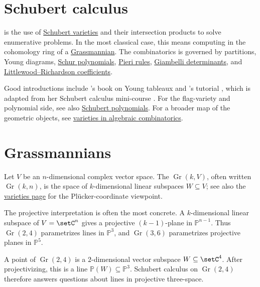 
\section[schubertCalculus]{Schubert calculus}

\label{schubertCalculusDefinition} is the use of
\hyperref[schubertVarietiesAndMatroids]{Schubert varieties} and their intersection
products to solve enumerative problems.  In the most classical case, this means
computing in the cohomology ring of a \hyperref[grassmannianVarieties]{Grassmannian}.
The combinatorics is governed by partitions, Young diagrams,
\hyperref[schurS]{Schur polynomials},
\hyperref[schubertCalculusPieri]{Pieri rules},
\hyperref[schubertCalculusGiambelli]{Giambelli determinants}, and
\hyperref[schurLittlewoodRichardson]{Littlewood--Richardson coefficients}.

Good introductions include 's book on Young tableaux
\cite{Fulton1997} and 's tutorial
\cite{Gillespie2019}, which is adapted from her Schubert calculus mini-course
\cite{Gillespie2017SchubertMiniCourse}.
For the flag-variety and polynomial side, see also
\hyperref[schubert]{Schubert polynomials}.  For a broader map of the
geometric objects, see \hyperref[varieties]{varieties in algebraic
combinatorics}.


\section[grassmannian]{Grassmannians}

Let $V$ be an $n$-dimensional complex vector space.  The
\label{grassmannianDefinition} $\operatorname{Gr}(k,V)$,
often written
$\operatorname{Gr}(k,n)$, is the space of $k$-dimensional linear subspaces
$W\subseteq V$; see also the \hyperref[grassmannianVarieties]{varieties page}
for the Plücker-coordinate viewpoint.

The projective interpretation is often the most concrete.  A $k$-dimensional
linear subspace of $V=\setC^n$ gives a projective $(k-1)$-plane in
$\mathbb{P}^{n-1}$.  Thus $\operatorname{Gr}(2,4)$ parametrizes lines in
$\mathbb{P}^3$, and $\operatorname{Gr}(3,6)$ parametrizes projective planes in
$\mathbb{P}^5$.

\begin{example*}
A point of $\operatorname{Gr}(2,4)$ is a $2$-dimensional vector subspace
$W\subseteq\setC^4$.  After projectivizing, this is a line
$\mathbb{P}(W)\subseteq\mathbb{P}^3$.  Schubert calculus on
$\operatorname{Gr}(2,4)$ therefore answers questions about lines in
projective three-space.
\end{example*}

